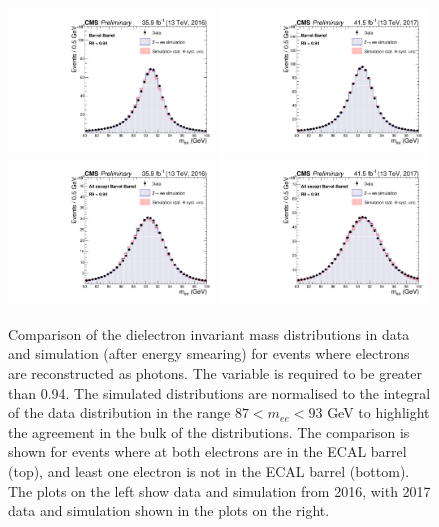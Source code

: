 \begin{figure}[h!]
  \centering
  \includegraphics[width=0.49\textwidth]{Figures/Objects/meeBarrel2016}
  \includegraphics[width=0.49\textwidth]{Figures/Objects/meeBarrel2017} \\
  \includegraphics[width=0.49\textwidth]{Figures/Objects/meeEndcap2016}
  \includegraphics[width=0.49\textwidth]{Figures/Objects/meeEndcap2017}
  \caption[Dielectron invariant mass distributions.]
  {
    Comparison of the dielectron invariant mass distributions in data and simulation
    (after energy smearing) for \Zee
    events where electrons are reconstructed as photons.
    The \RNINE variable is required to be greater than 0.94.
    The simulated distributions are
    normalised to the integral of the data distribution 
    in the range $87 < m_{ee} < 93$ GeV to highlight
    the agreement in the bulk of the distributions.
    The comparison is shown for events where at both electrons are in the ECAL barrel (top), 
    and least one electron is not in the ECAL barrel (bottom).
    The plots on the left show data and simulation from 2016, 
    with 2017 data and simulation shown in the plots on the right.
  }
  \label{fig:obj_mee}
\end{figure}

